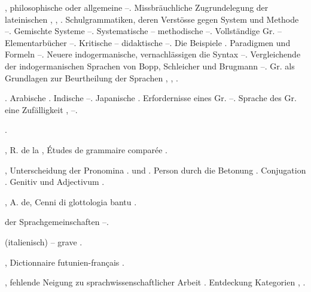 \begin{register}
, philosophische oder allgemeine \pageref{sp.10}–\pageref{sp.11}. Missbräuchliche Zugrundelegung der lateinischen \pageref{sp.25}, \pageref{sp.52}, \sed{\pageref{sp.91},} \pageref{sp.105}. Schulgrammatiken, deren Verstösse gegen System und Methode \pageref{sp.81}–\pageref{sp.82}.  Gemischte Systeme \pageref{sp.91}–\pageref{sp.92}.  Systematische – methodische \pageref{sp.109}–\pageref{sp.110}. Vollständige Gr. – Elementarbücher \pageref{sp.110}–\pageref{sp.113}. Kritische – didaktische \pageref{sp.113}–\pageref{sp.114}. Die Beispiele \pageref{sp.116}. Paradigmen und Formeln \pageref{sp.116}–\pageref{sp.119}.  Neuere indogermanische, vernachlässigen die Syntax \pageref{sp.137}–\pageref{sp.138}. Vergleichende der indogermanischen Sprachen von Bopp, Schleicher und Brugmann \pageref{sp.170}–\pageref{sp.173}. Gr. als Grundlagen zur Beurtheilung der Sprachen \pageref{sp.406}, \pageref{sp.450}, \pageref{sp.471}.

. Arabische \pageref{sp.21}. Indische \pageref{sp.22}–\pageref{sp.23}. Japanische \pageref{sp.24}. Erfordernisse eines Gr. \pageref{sp.81}–\pageref{sp.82}. Sprache des Gr. eine Zufälligkeit \pageref{sp.88}, \pageref{sp.120}–\pageref{sp.121}.


 \pageref{sp.216}.

, R. de la \pageref{sp.31}, Études de grammaire comparée \pageref{sp.481}.

 \pageref{sp.150}, \pageref{sp.282} Unterscheidung der Pronomina \pageref{sp.1}. und \pageref{sp.2}. Person durch die Betonung \pageref{sp.379}. Conjugation \pageref{sp.391}.  Genitiv und Adjectivum \pageref{sp.455}.

, A. de, Cenni di glottologia bantu \pageref{sp.283}.

 der Sprachgemeinschaften \pageref{sp.56}–\pageref{sp.58}.

 (italienisch) – grave \pageref{sp.222}.

, Dictionnaire futunien-français \pageref{sp.463}.

, fehlende Neigung zu sprachwissenschaftlicher Arbeit \pageref{sp.20}. Entdeckung  Kategorien \pageref{sp.20}, \pageref{sp.113}.


\end{register}
